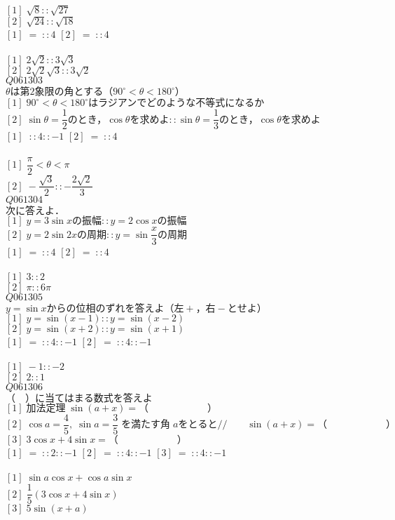 \documentclass[10pt,dvipdfmx]{jarticle}
\begin{document}
$[1]\;\sqrt{8}::\sqrt{27}$\\
$[2]\;\sqrt{24}::\sqrt{18}$\\
$[1]\;=\;::4$ 
$[2]\;=\;::4$ 
\\
\\
$[1]\;2\sqrt{2}::3\sqrt{3}$\\
$[2]\;2\sqrt{2}\sqrt{3}::3\sqrt{2}$\\
$Q061303$\\
${\theta}\text{は第}2\text{象限の角とする（}90^{\circ}<{\theta}<180^{\circ}\text{）}$\\
$[1]\;90^{\circ}<{\theta}<180^{\circ}\text{はラジアンでどのような不等式になるか}$\\
$[2]\;\sin {\theta} =\dfrac{1}{2}\text{のとき，}\cos {\theta} \text{を求めよ}::\sin {\theta} =\dfrac{1}{3}\text{のとき，}\cos {\theta} \text{を求めよ}$\\
$[1]\;\;::4::-1$ 
$[2]\;=\;::4$ 
\\
\\
$[1]\;\dfrac{{\pi}}{2}<{\theta}<{\pi}$\\
$[2]\;-\dfrac{\sqrt{3}}{2}::-\dfrac{2\sqrt{2}}{3}$\\
$Q061304$\\
$\text{次に答えよ．}$\\
$[1]\;y=3\sin x \text{の振幅}::y=2\cos x \text{の振幅}$\\
$[2]\;y=2\sin 2x \text{の周期}::y=\sin \dfrac{x}{3} \text{の周期}$\\
$[1]\;=\;::4$ 
$[2]\;=\;::4$ 
\\
\\
$[1]\;3::2$\\
$[2]\;{\pi}::6{\pi}$\\
$Q061305$\\
$y=\sin x \text{からの位相のずれを答えよ（左}+\text{，右}-\text{とせよ）}$\\
$[1]\;y=\sin (x-1) ::y=\sin (x-2) $\\
$[2]\;y=\sin (x+2) ::y=\sin (x+1) $\\
$[1]\;=\;::4::-1$ 
$[2]\;=\;::4::-1$ 
\\
\\
$[1]\;-1::-2$\\
$[2]\;2::1$\\
$Q061306$\\
$\text{（　）に当てはまる数式を答えよ}$\\
$[1]\;\text{加法定理}\;\sin (a+x) =\text{（　　　　　　）}$\\
$[2]\;\cos a =\dfrac{4}{5},\;\sin a =\dfrac{3}{5}\;\text{を満たす角}\;a\text{をとると}//\text{　　}\sin (a+x) =\text{（　　　　　　）}$\\
$[3]\;3\cos x +4\sin x =\text{（　　　　　　）}$\\
$[1]\;=\;::2::-1$ 
$[2]\;=\;::4::-1$ 
$[3]\;=\;::4::-1$ 
\\
\\
$[1]\;\sin a \cos x +\cos a \sin x $\\
$[2]\;\dfrac{1}{5}(3\cos x +4\sin x )$\\
$[3]\;5\sin (x+a) $\\
\newpage
\end{document}
